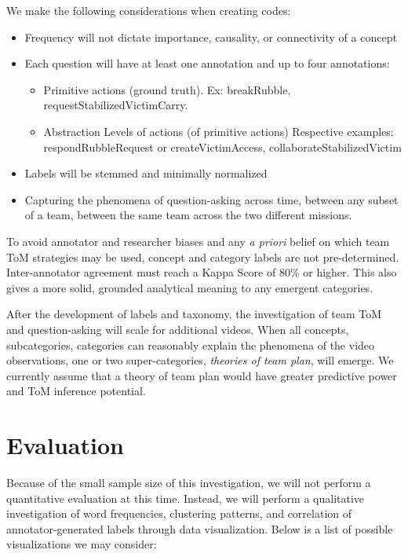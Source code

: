 We make the following considerations when creating codes: 

\begin{itemize}
    \item Frequency will not dictate importance, causality, or connectivity of a concept
    \item Each question will have at least one annotation and up to four
      annotations:
    \begin{itemize}
        \item Primitive actions (ground truth). Ex: breakRubble,
          requestStabilizedVictimCarry.
        \item Abstraction Levels of actions (of primitive actions) Respective
          examples: respondRubbleRequest or createVictimAccess, collaborateStabilizedVictim
    \end{itemize}
    \item Labels will be stemmed and minimally normalized
    \item Capturing the phenomena of question-asking across time, between any subset of a team, between the same team across the two different missions. 
\end{itemize}


To avoid annotator and researcher biases and any \emph{a priori} belief on
which team ToM strategies may be used, concept and category labels are not
pre-determined. Inter-annotator agreement must reach a Kappa Score of 80\% or
higher. This also gives a more solid, grounded analytical meaning to any
emergent categories. 

After the development of labels and taxonomy, the investigation of team ToM and
question-asking will scale for additional videos. When all concepts,
subcategories, categories can reasonably explain the phenomena of the video
observations, one or two super-categories, \emph{theories of team plan}, will
emerge. We currently assume that a theory of team plan would have greater
predictive power and ToM inference potential. 


\section{Evaluation}

Because of the small sample size of this investigation, we will not perform a
quantitative evaluation at this time. Instead, we will perform a qualitative
investigation of word frequencies, clustering patterns, and correlation of
annotator-generated labels through data visualization. Below is a list of
possible visualizations we may consider:

